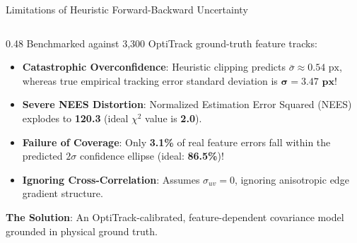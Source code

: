 \documentclass[aspectratio=169, 10pt]{beamer}
\begin{document}
\begin{frame}{Limitations of Heuristic Forward-Backward Uncertainty}
\begin{columns}[T]
\begin{column}{0.48\textwidth}
      Benchmarked against 3,300 OptiTrack ground-truth feature tracks:
      \begin{itemize}
        \setlength{\itemsep}{4pt}
        \item \textbf{Catastrophic Overconfidence}: Heuristic clipping predicts $\bar{\sigma} \approx 0.54\text{ px}$, whereas true empirical tracking error standard deviation is $\mathbf{\sigma = 3.47\text{ px}}$!
        \item \textbf{Severe NEES Distortion}: Normalized Estimation Error Squared (NEES) explodes to \textbf{120.3} (ideal $\chi^2$ value is \textbf{2.0}).
        \item \textbf{Failure of Coverage}: Only \textbf{3.1\%} of real feature errors fall within the predicted $2\sigma$ confidence ellipse (ideal: \textbf{86.5\%})!
        \item \textbf{Ignoring Cross-Correlation}: Assumes $\sigma_{uv} = 0$, ignoring anisotropic edge gradient structure.
      \end{itemize}
      \vspace{0.15cm}

      {\small \textbf{\textcolor{EmeraldGreen}{The Solution}}: An OptiTrack-calibrated, feature-dependent covariance model grounded in physical ground truth.}
    \end{column}
  \end{columns}
\end{frame}
\end{document}
